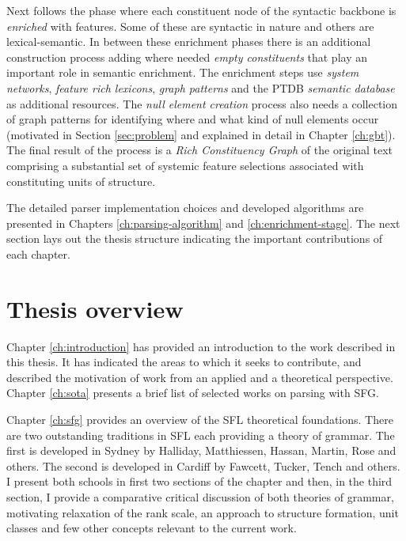 Next follows the phase where each constituent node of the syntactic backbone is \textit{enriched} with features. Some of these are syntactic in nature and others are lexical-semantic. In between these enrichment phases there is an additional construction process adding where needed \textit{empty constituents} that play an important role in semantic enrichment. The enrichment steps use \textit{system networks}, \textit{feature rich lexicons}, \textit{graph patterns} and the PTDB \textit{semantic database} as additional resources. The \textit{null element creation} process also needs a collection of graph patterns for identifying where and what kind of null elements occur (motivated in Section \ref{sec:problem} and explained in detail in Chapter \ref{ch:gbt}). The final result of the process is a \textit{Rich Constituency Graph} of the original text comprising a substantial set of systemic feature selections associated with constituting units of structure. 

The detailed parser implementation choices and developed algorithms are presented in Chapters \ref{ch:parsing-algorithm} and \ref{ch:enrichment-stage}. The next section lays out the thesis structure indicating the important contributions of each chapter.

\section{Thesis overview}
\label{sec:thesis-structure}

Chapter \ref{ch:introduction} has provided an introduction to the work described in this thesis. It has indicated the areas to which it seeks to contribute, and described the motivation of work from an applied and a theoretical perspective. Chapter \ref{ch:sota} presents a brief list of selected works on parsing with SFG. 

Chapter \ref{ch:sfg} provides an overview of the SFL theoretical foundations. There are two outstanding traditions in SFL each providing a theory of grammar. The first is developed in Sydney by Halliday, Matthiessen, Hassan, Martin, Rose and others. The second is developed in Cardiff by Fawcett, Tucker, Tench and others. I present both schools in first two sections of the chapter and then, in the third section, I provide a comparative critical discussion of both theories of grammar, motivating relaxation of the rank scale, an approach to structure formation, unit classes and few other concepts relevant to the current work. 

